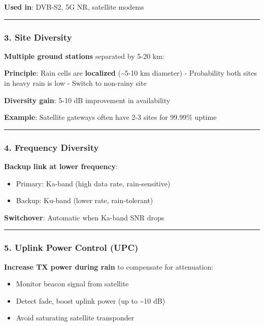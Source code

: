 \textbf{Used in}: DVB-S2, 5G NR, satellite modems

\begin{center}\rule{0.5\linewidth}{0.5pt}\end{center}

\subsubsection{3. Site Diversity}\label{site-diversity}

\textbf{Multiple ground stations} separated by 5-20 km:

\textbf{Principle}: Rain cells are \textbf{localized}
(\textasciitilde5-10 km diameter) - Probability both sites in heavy rain
is low - Switch to non-rainy site

\textbf{Diversity gain}: 5-10 dB improvement in availability

\textbf{Example}: Satellite gateways often have 2-3 sites for 99.99\%
uptime

\begin{center}\rule{0.5\linewidth}{0.5pt}\end{center}

\subsubsection{4. Frequency Diversity}\label{frequency-diversity}

\textbf{Backup link at lower frequency}:

\begin{itemize}
\tightlist
\item
  Primary: Ka-band (high data rate, rain-sensitive)
\item
  Backup: Ku-band (lower rate, rain-tolerant)
\end{itemize}

\textbf{Switchover}: Automatic when Ka-band SNR drops

\begin{center}\rule{0.5\linewidth}{0.5pt}\end{center}

\subsubsection{5. Uplink Power Control
(UPC)}\label{uplink-power-control-upc}

\textbf{Increase TX power during rain} to compensate for attenuation:

\begin{itemize}
\tightlist
\item
  Monitor beacon signal from satellite
\item
  Detect fade, boost uplink power (up to \textasciitilde10 dB)
\item
  Avoid saturating satellite transponder
\end{itemize}

